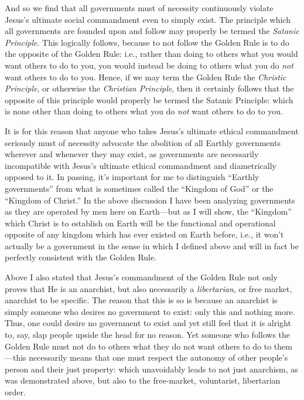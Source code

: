 \documentclass[letterpaper,12pt]{article}
\begin{document}
And so we find that all governments must of necessity continuously violate Jesus's ultimate social commandment even to simply exist. The principle which all governments are founded upon and follow may properly be termed the \emph{Satanic Principle}.\label{SatanicPrinciple} This logically follows, because to not follow the Golden Rule is to do the opposite of the Golden Rule: i.e., rather than doing to others what you would want others to do to you, you would instead be doing to others what you do \emph{not} want others to do to you. Hence, if we may term the Golden Rule the \emph{Christic Principle}, or otherwise the \emph{Christian Principle}, then it certainly follows that the opposite of this principle would properly be termed the Satanic Principle: which is none other than doing to others what you do \emph{not} want others to do to you.

It is for this reason that anyone who takes Jesus's ultimate ethical commandment seriously must of necessity advocate the abolition of all Earthly governments wherever and whenever they may exist, as governments are necessarily incompatible with Jesus's ultimate ethical commandment and diametrically opposed to it. In passing, it's important for me to distinguish ``Earthly governments'' from what is sometimes called the ``Kingdom of God'' or the ``Kingdom of Christ.'' In the above discussion I have been analyzing governments as they are operated by men here on Earth---but as I will show, the ``Kingdom'' which Christ is to establish on Earth will be the functional and operational opposite of any kingdom which has ever existed on Earth before, i.e., it won't actually be a government in the sense in which I defined above and will in fact be perfectly consistent with the Golden Rule.

Above I also stated that Jesus's commandment of the Golden Rule not only proves that He is an anarchist, but also necessarily a \emph{libertarian}, or free market, anarchist to be specific. The reason that this is so is because an anarchist is simply someone who desires no government to exist: only this and nothing more. Thus, one could desire no government to exist and yet still feel that it is alright to, say, slap people upside the head for no reason. Yet someone who follows the Golden Rule must not do to others what they do not want others to do to them---this necessarily means that one must respect the autonomy of other people's person and their just property: which unavoidably leads to not just anarchism, as was demonstrated above, but also to the free-market, voluntarist, libertarian order.
\end{document}
